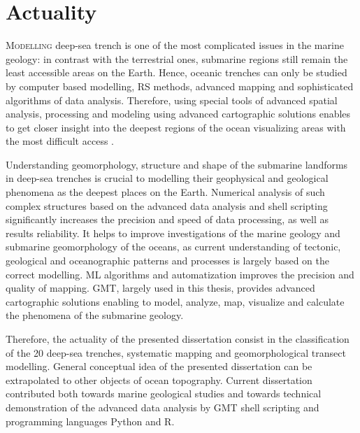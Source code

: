 \documentclass[11pt,a4paper]{report}
\begin{document}
{%
\pagebreak
\section{Actuality}
\lettrine[lines=3]{\color{DarkOrchid4}M}{odelling} deep-sea trench is one of the most complicated issues in the marine geology: in contrast with the terrestrial ones, submarine regions still remain the least accessible areas on the Earth. Hence, oceanic trenches can only be studied by computer based modelling, \ac{RS} methods, advanced mapping and sophisticated algorithms of data analysis. Therefore, using special tools of advanced spatial analysis, processing and modeling using advanced cartographic solutions enables to get closer insight into the deepest regions of the ocean visualizing areas with the most difficult access \cite{Calder}. 

Understanding geomorphology, structure and shape of the submarine landforms in deep-sea trenches is crucial to modelling their geophysical and geological phenomena as the deepest places on the Earth. Numerical analysis of such complex structures based on the advanced data analysis and shell scripting significantly increases the precision and speed of data processing, as well as results reliability. It helps to improve investigations of the marine geology and submarine geomorphology of the oceans, as current understanding of tectonic, geological and oceanographic patterns and processes is largely based on the correct modelling. \ac{ML} algorithms and automatization improves the precision and quality of mapping. \ac{GMT}, largely used in this thesis, provides advanced cartographic solutions enabling to model, analyze, map, visualize and calculate the phenomena of the submarine geology.

Therefore, the actuality of the presented dissertation consist in the classification of the 20 deep-sea trenches, systematic mapping and geomorphological transect modelling. General conceptual idea of the presented dissertation can be extrapolated to other objects of ocean topography. Current dissertation contributed both towards marine geological studies and towards technical demonstration of the advanced data analysis by \ac{GMT} shell scripting and programming languages Python and R. 

}
\end{document}
